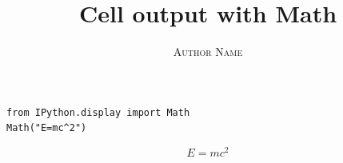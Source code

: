 \documentclass[a4paper,11pt,oneside]{book}
\title{\Huge \textbf{Cell output with Math}}
\author{\textsc{Author Name}}
\begin{document}
\sloppy

\frontmatter
\maketitle

\tableofcontents

\mainmatter

% 
% 

\begin{verbatim}
from IPython.display import Math
Math("E=mc^2")
\end{verbatim}

\begin{equation}
E=mc^2
\end{equation}
\end{document}
